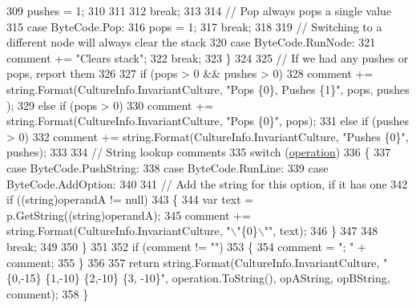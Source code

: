 \begin{DoxyCode}
309                         pushes = 1;
310 
311 
312                     \textcolor{keywordflow}{break};
313 
314                 \textcolor{comment}{// Pop always pops a single value}
315                 \textcolor{keywordflow}{case} ByteCode.Pop:
316                     pops = 1;
317                     \textcolor{keywordflow}{break};
318 
319                 \textcolor{comment}{// Switching to a different node will always clear the stack}
320                 \textcolor{keywordflow}{case} ByteCode.RunNode:
321                     comment += \textcolor{stringliteral}{"Clears stack"};
322                     \textcolor{keywordflow}{break};
323             \}
324 
325             \textcolor{comment}{// If we had any pushes or pops, report them}
326 
327             \textcolor{keywordflow}{if} (pops > 0 && pushes > 0)
328                 comment += string.Format(CultureInfo.InvariantCulture, \textcolor{stringliteral}{"Pops \{0\}, Pushes \{1\}"}, pops, pushes
      );
329             \textcolor{keywordflow}{else} \textcolor{keywordflow}{if} (pops > 0)
330                 comment += string.Format(CultureInfo.InvariantCulture, \textcolor{stringliteral}{"Pops \{0\}"}, pops);
331             \textcolor{keywordflow}{else} \textcolor{keywordflow}{if} (pushes > 0)
332                 comment += string.Format(CultureInfo.InvariantCulture, \textcolor{stringliteral}{"Pushes \{0\}"}, pushes);
333 
334             \textcolor{comment}{// String lookup comments}
335             \textcolor{keywordflow}{switch} (\hyperlink{a00119_a566bf5f7198cc353ea5c3710cb3a31cb}{operation})
336             \{
337                 \textcolor{keywordflow}{case} ByteCode.PushString:
338                 \textcolor{keywordflow}{case} ByteCode.RunLine:
339                 \textcolor{keywordflow}{case} ByteCode.AddOption:
340 
341                     \textcolor{comment}{// Add the string for this option, if it has one}
342                     \textcolor{keywordflow}{if} ((\textcolor{keywordtype}{string})operandA != null)
343                     \{
344                         var text = p.GetString((string)operandA);
345                         comment += string.Format(CultureInfo.InvariantCulture, \textcolor{stringliteral}{"\(\backslash\)"\{0\}\(\backslash\)""}, text);
346                     \}
347 
348                     \textcolor{keywordflow}{break};
349 
350             \}
351 
352             \textcolor{keywordflow}{if} (comment != \textcolor{stringliteral}{""})
353             \{
354                 comment = \textcolor{stringliteral}{"; "} + comment;
355             \}
356 
357             \textcolor{keywordflow}{return} string.Format(CultureInfo.InvariantCulture, \textcolor{stringliteral}{"\{0,-15\} \{1,-10\} \{2,-10\} \{3, -10\}"}, 
      operation.ToString(), opAString, opBString, comment);
358         \}
\end{DoxyCode}


